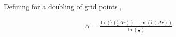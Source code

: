 \documentclass[a4paper]{report}
\begin{document}
Defining  for a doubling of grid points ,

\begin{align*}
    \alpha = \frac{\ln \left( \hat{\epsilon}\left( \frac{1}{2}\Delta  r\right)
            \right) -\ln \left( \hat{\epsilon}\left( \Delta  r\right)
    \right)}{\ln \left( \frac{1}{2} \right)}
\end{align*}


\end{document}
